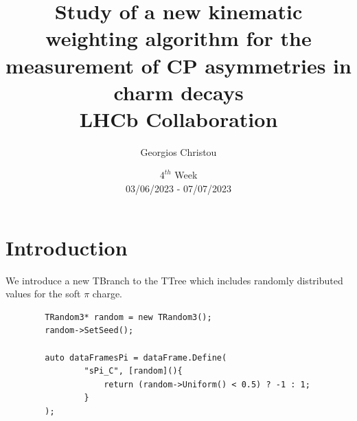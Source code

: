 \documentclass{article}
\title{
        \textbf{Study of a new kinematic weighting algorithm for the measurement of CP asymmetries in charm decays}
        \\
        LHCb Collaboration
}
\author{Georgios Christou}
\date{
        $4^{th}$ Week
        \\
        03/06/2023 - 07/07/2023
}
\begin{document}
    \begin{figure}[t]
        \centering
        \hspace{1cm}
    \end{figure}
    \maketitle

    \pagebreak
    
    \section{Introduction}

    We introduce a new TBranch to the TTree which includes randomly distributed values for the soft $\pi$ charge.

    \begin{lstlisting}
        TRandom3* random = new TRandom3();
        random->SetSeed();

        auto dataFramesPi = dataFrame.Define(
                "sPi_C", [random](){
                    return (random->Uniform() < 0.5) ? -1 : 1;
                }
        );
    \end{lstlisting}
\end{document}
